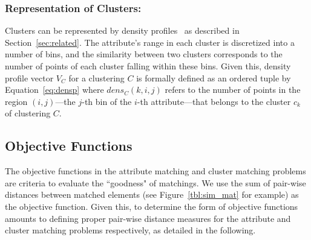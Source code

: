 \subsubsection{Representation of Clusters:}
Clusters can be represented by density profiles~\cite{Bae2010} as described in Section~\ref{sec:related}. The attribute's range in each cluster is discretized into a number of bins, and the similarity between two clusters corresponds to the number of points of each cluster falling within these bins. Given this, density profile vector $V_C$ for a clustering $C$ is formally defined as an ordered tuple by Equation~\ref{eq:densp}
where $dens_C(k, i, j)$ refers to the number of points in the region $(i, j)$---the $j$-th bin of the $i$-th attribute---that belongs to the cluster $c_k$ of clustering $C$.

\subsection{Objective Functions}
The objective functions in the attribute matching and cluster matching problems are criteria to evaluate the ``goodness" of matchings. We use the sum of pair-wise distances between matched elements (see Figure~\ref{tbl:sim_mat} for example) as the objective function. Given this, to determine the form of objective functions amounts to defining proper pair-wise distance measures for the attribute and cluster matching problems respectively, as detailed in the following.
\label{sec:obj_funcs}
